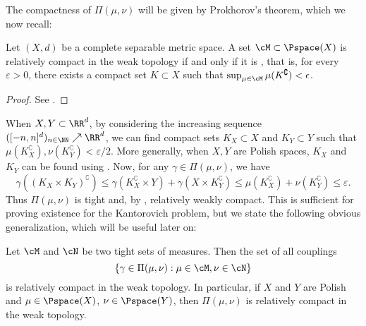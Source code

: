 \documentclass[oneside,reqno,letterpaper]{amsart}
\begin{document}
The compactness of \(\Pi(\mu, \nu)\) will be given by Prokhorov's theorem, which we now recall:
\begin{theorem}[Prokhorov]\label{prop:prokhorov}
  Let \((X, d)\) be a complete separable metric space.
A set \(\cM \subset \Pspace(X)\) is relatively compact in the weak topology if and only if it is , that is, for every \(\varepsilon > 0\), there exists a compact set \(K \subset X\) such that \(\sup_{\mu \in \cM} \mu(K^\complement) < \epsilon\).
\end{theorem}
\begin{proof}
  See \cite[Theorem 7.9]{Zitkovic2013weak}.
\end{proof}

When \(X, Y \subset \RR^d\), by considering the increasing sequence \(([-n, n]^d)_{n \in \NN} \nearrow \RR^d\), we can find compact sets \(K_X \subset X\) and \(K_Y \subset Y\) such that \(\mu(K_X^\complement), \nu(K_Y^\complement) < \varepsilon / 2\).
More generally, when \(X, Y\) are Polish spaces, \(K_X\) and \(K_Y\) can be found using .
Now, for any \(\gamma \in \Pi(\mu, \nu)\), we have
\[
  \gamma\left( (K_X \times K_Y)^\complement \right)
  \leq \gamma(K_X^\complement \times Y) + \gamma(X \times K_Y^\complement)
  \leq \mu(K_X^\complement) + \nu(K_Y^\complement)
  \leq \varepsilon.
\]
Thus \(\Pi(\mu, \nu)\) is tight and, by , relatively weakly compact.
This is sufficient for proving existence for the Kantorovich problem, but we state the following obvious generalization, which will be useful later on:
\begin{proposition}\label{prop:couplings-of-tight-is-tight}
  Let \(\cM\) and \(\cN\) be two tight sets of measures.
  Then the set of all couplings
  \[
    \left\{\gamma \in \Pi(\mu, \nu) : \mu \in \cM, \nu \in \cN \right\}
  \]
  is relatively compact in the weak topology.
  In particular, if \(X\) and \(Y\) are Polish and \(\mu \in \Pspace(X)\), \(\nu \in \Pspace(Y)\), then \(\Pi(\mu, \nu)\) is relatively compact in the weak topology.
\end{proposition}
\end{document}
